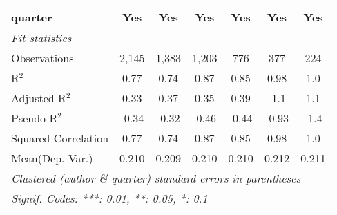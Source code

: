 \begin{tabular}{lcccccc}
   quarter                                                    & Yes           & Yes          & Yes          & Yes            & Yes           & Yes\\  
   \midrule
   \emph{Fit statistics}\\
   Observations                                               & 2,145         & 1,383        & 1,203        & 776            & 377           & 224\\  
   R$^2$                                                      & 0.77          & 0.74         & 0.87         & 0.85           & 0.98          & 1.0\\  
   Adjusted R$^2$                                             & 0.33          & 0.37         & 0.35         & 0.39           & -1.1          & 1.1\\  
   Pseudo R$^2$                                               & -0.34         & -0.32        & -0.46        & -0.44          & -0.93         & -1.4\\  
   Squared Correlation                                        & 0.77          & 0.74         & 0.87         & 0.85           & 0.98          & 1.0\\  
Mean(Dep. Var.) & 0.210 & 0.209 & 0.210 & 0.210 & 0.212 & 0.211 \\
   \midrule \midrule
   \multicolumn{7}{l}{\emph{Clustered (author \& quarter) standard-errors in parentheses}}\\
   \multicolumn{7}{l}{\emph{Signif. Codes: ***: 0.01, **: 0.05, *: 0.1}}\\
\end{tabular}
\par\endgroup
